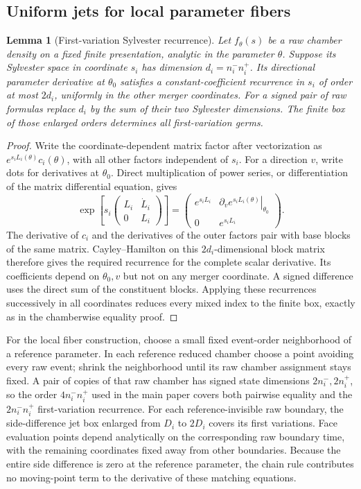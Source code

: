 \documentclass[11pt]{article}
\newtheorem{lemma}[theorem]{Lemma}
\begin{document}
\subsection{Uniform jets for local parameter fibers}

\begin{lemma}[First-variation Sylvester recurrence]
\label{lem:supp-first-variation}
Let $f_\theta(s)$ be a raw chamber density on a fixed finite presentation, analytic in the parameter $\theta$.  Suppose its Sylvester space in coordinate $s_i$ has dimension $d_i=n_i^-n_i^+$.  Its directional parameter derivative at $\theta_0$ satisfies a constant-coefficient recurrence in $s_i$ of order at most $2d_i$, uniformly in the other merger coordinates.  For a signed pair of raw formulas replace $d_i$ by the sum of their two Sylvester dimensions.  The finite box of those enlarged orders determines all first-variation germs.
\end{lemma}

\begin{proof}
Write the coordinate-dependent matrix factor after vectorization as $e^{s_iL_i(\theta)}c_i(\theta)$, with all other factors independent of $s_i$.  For a direction $v$, write dots for derivatives at $\theta_0$.  Direct multiplication of power series, or differentiation of the matrix differential equation, gives
\[
\exp\!\left[s_i\begin{pmatrix}L_i&\dot L_i\\0&L_i\end{pmatrix}\right]
=\begin{pmatrix}e^{s_iL_i}&\displaystyle\left.\partial_v e^{s_iL_i(\theta)}\right|_{\theta_0}\\0&e^{s_iL_i}\end{pmatrix}.
\]
The derivative of $c_i$ and the derivatives of the outer factors pair with base blocks of the same matrix.  Cayley--Hamilton on this $2d_i$-dimensional block matrix therefore gives the required recurrence for the complete scalar derivative.  Its coefficients depend on $\theta_0,v$ but not on any merger coordinate.  A signed difference uses the direct sum of the constituent blocks.  Applying these recurrences successively in all coordinates reduces every mixed index to the finite box, exactly as in the chamberwise equality proof.
\end{proof}

For the local fiber construction, choose a small fixed event-order neighborhood of a reference parameter.  In each reference reduced chamber choose a point avoiding every raw event; shrink the neighborhood until its raw chamber assignment stays fixed.  A pair of copies of that raw chamber has signed state dimensions $2n_i^-,2n_i^+$, so the order $4n_i^-n_i^+$ used in the main paper covers both pairwise equality and the $2n_i^-n_i^+$ first-variation recurrence.  For each reference-invisible raw boundary, the side-difference jet box enlarged from $D_i$ to $2D_i$ covers its first variations.  Face evaluation points depend analytically on the corresponding raw boundary time, with the remaining coordinates fixed away from other boundaries.  Because the entire side difference is zero at the reference parameter, the chain rule contributes no moving-point term to the derivative of these matching equations.
\end{document}
